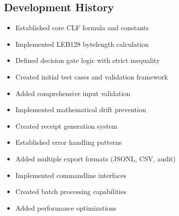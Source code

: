 \documentclass[letterpaper,10pt,english]{sphinxmanual}
\begin{document}
\subsection{Development History}
\label{\detokenize{changelog:development-history}}
\sphinxAtStartPar
{}
\begin{itemize}
\item {} 
\sphinxAtStartPar
Established core CLF formula and constants

\item {} 
\sphinxAtStartPar
Implemented LEB128 byte\sphinxhyphen{}length calculation

\item {} 
\sphinxAtStartPar
Defined decision gate logic with strict inequality

\item {} 
\sphinxAtStartPar
Created initial test cases and validation framework

\end{itemize}

\sphinxAtStartPar
{}
\begin{itemize}
\item {} 
\sphinxAtStartPar
Added comprehensive input validation

\item {} 
\sphinxAtStartPar
Implemented mathematical drift prevention

\item {} 
\sphinxAtStartPar
Created receipt generation system

\item {} 
\sphinxAtStartPar
Established error handling patterns

\end{itemize}

\sphinxAtStartPar
{}
\begin{itemize}
\item {} 
\sphinxAtStartPar
Added multiple export formats (JSONL, CSV, audit)

\item {} 
\sphinxAtStartPar
Implemented command\sphinxhyphen{}line interfaces

\item {} 
\sphinxAtStartPar
Created batch processing capabilities

\item {} 
\sphinxAtStartPar
Added performance optimizations

\end{itemize}
\end{document}
